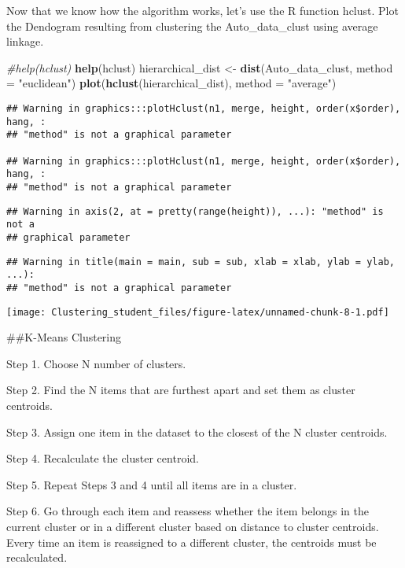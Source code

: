 \documentclass[11pt,]{article}
\newenvironment{Shaded}{\begin{snugshade}}{\end{snugshade}}
\newcommand{\CommentTok}[1]{\textcolor[rgb]{0.56,0.35,0.01}{\textit{#1}}}
\newcommand{\DataTypeTok}[1]{\textcolor[rgb]{0.13,0.29,0.53}{#1}}
\newcommand{\KeywordTok}[1]{\textcolor[rgb]{0.13,0.29,0.53}{\textbf{#1}}}
\newcommand{\NormalTok}[1]{#1}
\newcommand{\StringTok}[1]{\textcolor[rgb]{0.31,0.60,0.02}{#1}}
\begin{document}
Now that we know how the algorithm works, let's use the R function
hclust. Plot the Dendogram resulting from clustering the
Auto\_data\_clust using average linkage.

\begin{Shaded}
\begin{Highlighting}[]
\CommentTok{#help(hclust)}
\KeywordTok{help}\NormalTok{(hclust)}
\NormalTok{hierarchical_dist <-}\StringTok{ }\KeywordTok{dist}\NormalTok{(Auto_data_clust, }\DataTypeTok{method =} \StringTok{"euclidean"}\NormalTok{)}
\KeywordTok{plot}\NormalTok{(}\KeywordTok{hclust}\NormalTok{(hierarchical_dist), }\DataTypeTok{method =} \StringTok{"average"}\NormalTok{)}
\end{Highlighting}
\end{Shaded}

\begin{verbatim}
## Warning in graphics:::plotHclust(n1, merge, height, order(x$order), hang, :
## "method" is not a graphical parameter

## Warning in graphics:::plotHclust(n1, merge, height, order(x$order), hang, :
## "method" is not a graphical parameter
\end{verbatim}

\begin{verbatim}
## Warning in axis(2, at = pretty(range(height)), ...): "method" is not a
## graphical parameter
\end{verbatim}

\begin{verbatim}
## Warning in title(main = main, sub = sub, xlab = xlab, ylab = ylab, ...):
## "method" is not a graphical parameter
\end{verbatim}

\texttt{[image: Clustering\_student\_files/figure-latex/unnamed-chunk-8-1.pdf]}

\newpage

\#\#K-Means Clustering

Step 1. Choose N number of clusters.

Step 2. Find the N items that are furthest apart and set them as cluster
centroids.

Step 3. Assign one item in the dataset to the closest of the N cluster
centroids.

Step 4. Recalculate the cluster centroid.

Step 5. Repeat Steps 3 and 4 until all items are in a cluster.

Step 6. Go through each item and reassess whether the item belongs in
the current cluster or in a different cluster based on distance to
cluster centroids. Every time an item is reassigned to a different
cluster, the centroids must be recalculated.
\end{document}
